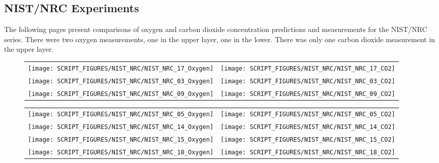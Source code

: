 \clearpage

\subsection{NIST/NRC Experiments}

The following pages present comparisons of oxygen and carbon dioxide concentration predictions and measurements for the
NIST/NRC series. There were two oxygen measurements, one in the upper layer, one in the lower.  There was only one carbon
dioxide measurement in the upper layer.

\begin{figure}[h!]
\begin{tabular*}{\textwidth}{l@{\extracolsep{\fill}}r}
\texttt{[image: SCRIPT\_FIGURES/NIST\_NRC/NIST\_NRC\_17\_Oxygen]} &
\texttt{[image: SCRIPT\_FIGURES/NIST\_NRC/NIST\_NRC\_17\_CO2]} \\
\texttt{[image: SCRIPT\_FIGURES/NIST\_NRC/NIST\_NRC\_03\_Oxygen]} &
\texttt{[image: SCRIPT\_FIGURES/NIST\_NRC/NIST\_NRC\_03\_CO2]} \\
\texttt{[image: SCRIPT\_FIGURES/NIST\_NRC/NIST\_NRC\_09\_Oxygen]} &
\texttt{[image: SCRIPT\_FIGURES/NIST\_NRC/NIST\_NRC\_09\_CO2]}
\end{tabular*}
\label{NIST_NRC_Gas_Open_1}
\end{figure}

\newpage

\begin{figure}[p]
\begin{tabular*}{\textwidth}{l@{\extracolsep{\fill}}r}
\texttt{[image: SCRIPT\_FIGURES/NIST\_NRC/NIST\_NRC\_05\_Oxygen]} &
\texttt{[image: SCRIPT\_FIGURES/NIST\_NRC/NIST\_NRC\_05\_CO2]} \\
\texttt{[image: SCRIPT\_FIGURES/NIST\_NRC/NIST\_NRC\_14\_Oxygen]} &
\texttt{[image: SCRIPT\_FIGURES/NIST\_NRC/NIST\_NRC\_14\_CO2]} \\
\texttt{[image: SCRIPT\_FIGURES/NIST\_NRC/NIST\_NRC\_15\_Oxygen]} &
\texttt{[image: SCRIPT\_FIGURES/NIST\_NRC/NIST\_NRC\_15\_CO2]} \\
\texttt{[image: SCRIPT\_FIGURES/NIST\_NRC/NIST\_NRC\_18\_Oxygen]} &
\texttt{[image: SCRIPT\_FIGURES/NIST\_NRC/NIST\_NRC\_18\_CO2]}
\end{tabular*}
\label{NIST_NRC_Gas_Open_2}
\end{figure}

